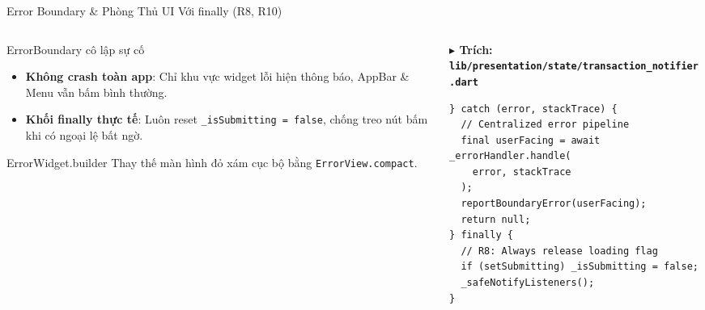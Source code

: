 \documentclass[aspectratio=169, 10pt]{beamer}
\newcommand{\speakerA}{\hfill\tcbox[colback=IndigoAccent,colframe=IndigoAccent,boxsep=1pt,left=3pt,right=3pt,top=1pt,bottom=1pt]{\tiny\bfseries\color{white}SV A: Nguyễn Đức Hải}}
\begin{document}
\begin{frame}[fragile]{Error Boundary \& Phòng Thủ UI Với finally (R8, R10) \speakerA}
  \begin{columns}[c]
    \begin{column}{0.48\textwidth}
      \begin{infobox}[RoseDanger]{ErrorBoundary cô lập sự cố}
        \begin{itemize}\setlength{\itemsep}{3pt}\scriptsize
          \item \textbf{Không crash toàn app}: Chỉ khu vực widget lỗi hiện thông báo, AppBar \& Menu vẫn bấm bình thường.
          \item \textbf{Khối finally thực tế}: Luôn reset \texttt{\_isSubmitting = false}, chống treo nút bấm khi có ngoại lệ bất ngờ.
        \end{itemize}
      \end{infobox}
      \vspace{1mm}
      \begin{infobox}[IndigoAccent]{ErrorWidget.builder}
        \scriptsize Thay thế màn hình đỏ xám cục bộ bằng \texttt{ErrorView.compact}.
      \end{infobox}
    \end{column}

    \begin{column}{0.52\textwidth}
\vspace{1mm}
{\scriptsize\bfseries\color{NavyPrimary} $\blacktriangleright$ Trích: \texttt{lib/presentation/state/transaction_notifier.dart}}\\[1mm]
\begin{lstlisting}
} catch (error, stackTrace) {
  // Centralized error pipeline
  final userFacing = await _errorHandler.handle(
    error, stackTrace
  );
  reportBoundaryError(userFacing);
  return null;
} finally {
  // R8: Always release loading flag
  if (setSubmitting) _isSubmitting = false;
  _safeNotifyListeners();
}
\end{lstlisting}
    \end{column}
  \end{columns}
\end{frame}
\end{document}
